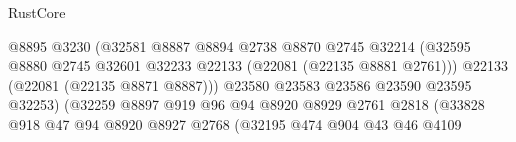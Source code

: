\begin{lexlean}{RustCore}
\begin{coremodule}
                                                @8895
                                                @3230
                                                (@32581
                                                  @8887
                                                  @8894
                                                  @2738
                                                  @8870
                                                  @2745
                                                  @32214
                                                  (@32595
                                                    @8880
                                                    @2745
                                                    @32601
                                                    @32233
                                                    @22133
                                                    (@22081 (@22135 @8881 @2761)))
                                                  @22133
                                                  (@22081 (@22135 @8871 @8887)))
                                                @23580
                                                @23583
                                                @23586
                                                @23590
                                                @23595
                                                @32253)
                                              (@32259
                                                @8897
                                                @919
                                                @96
                                                @94
                                                @8920
                                                @8929
                                                @2761
                                                @2818
                                                (@33828
                                                  @918
                                                  @47
                                                  @94
                                                  @8920
                                                  @8927
                                                  @2768
                                                  (@32195
                                                    @474
                                                    @904
                                                    @43
                                                    @46
                                                    @4109

\end{coremodule}
\end{lexlean}

